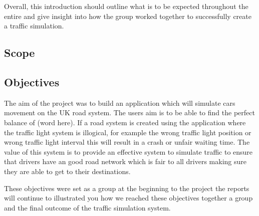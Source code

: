 \documentclass[11pt]{article}
\begin{document}
	Overall, this introduction should outline what is to be expected throughout the entire and give insight into how the group worked together to successfully create a traffic simulation.
	
	\subsection{Scope}%
	
	\subsection{Objectives} %
	The aim of the project was to build an application which will simulate cars movement on the UK road system. The users aim is to be able to find the perfect balance of (word here). If a road system is created using the application where the traffic light system is illogical, for example the wrong traffic light position or wrong traffic light interval this will result in a crash or unfair waiting time.
	The value of this system is to provide an effective system to simulate traffic to ensure that drivers have an good road network which is fair to all drivers making sure they are able to get to their destinations. 
	
	These objectives were set as a group at the beginning to the project the reports will continue to illustrated you how we reached these objectives together a group and the final outcome of the traffic simulation system.
	
\end{document}
